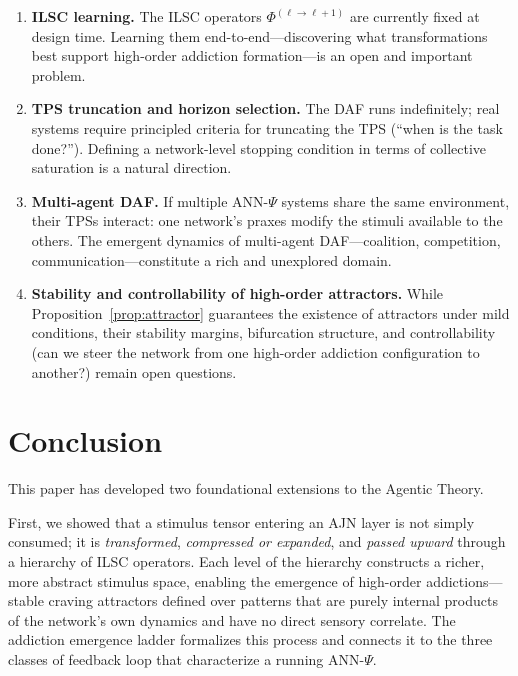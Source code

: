 \documentclass[12pt,a4paper]{article}
\begin{document}
\begin{enumerate}
\item \textbf{ILSC learning.} The ILSC operators $\Phi^{(\ell\to\ell+1)}$ are
currently fixed at design time. Learning them end-to-end---discovering what
transformations best support high-order addiction formation---is an open and
important problem.

\item \textbf{TPS truncation and horizon selection.} The DAF runs indefinitely;
real systems require principled criteria for truncating the TPS (``when is the
task done?''). Defining a network-level stopping condition in terms of
collective saturation is a natural direction.

\item \textbf{Multi-agent DAF.} If multiple ANN-$\Psi$ systems share the same
environment, their TPSs interact: one network's praxes modify the stimuli
available to the others. The emergent dynamics of multi-agent DAF---coalition,
competition, communication---constitute a rich and unexplored domain.

\item \textbf{Stability and controllability of high-order attractors.} While
Proposition~\ref{prop:attractor} guarantees the existence of attractors under
mild conditions, their stability margins, bifurcation structure, and
controllability (can we steer the network from one high-order addiction
configuration to another?) remain open questions.
\end{enumerate}

\section{Conclusion}

This paper has developed two foundational extensions to the Agentic Theory.

First, we showed that a stimulus tensor entering an AJN layer is not simply
consumed; it is \textit{transformed}, \textit{compressed or expanded}, and
\textit{passed upward} through a hierarchy of ILSC operators. Each level of the
hierarchy constructs a richer, more abstract stimulus space, enabling the
emergence of high-order addictions---stable craving attractors defined over
patterns that are purely internal products of the network's own dynamics and
have no direct sensory correlate. The addiction emergence ladder formalizes
this process and connects it to the three classes of feedback loop that
characterize a running ANN-$\Psi$.
\end{document}
